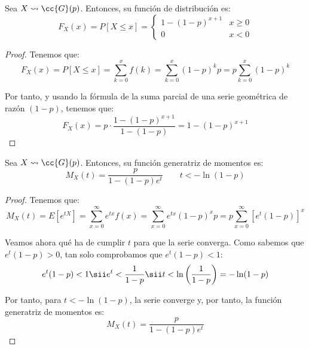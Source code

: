 \begin{prop}
    Sea $X\leadsto \cc{G}(p)$. Entonces, su función de distribución es:
    \begin{equation*}
        F_X(x) = P[X\leq x] = \begin{cases}
            1-(1-p)^{x+1} & x\geq 0 \\
            0 & x<0
        \end{cases}
    \end{equation*}
\end{prop}
\begin{proof}
    Tenemos que:
    \begin{equation*}
        F_X(x) = P[X\leq x] = \sum_{k=0}^x f(k) = \sum_{k=0}^x (1-p)^{k}p = p\sum_{k=0}^x (1-p)^{k}
    \end{equation*}

    Por tanto, y usando la fórmula de la suma parcial de una serie geométrica de razón $(1-p)$, tenemos que:
    \begin{equation*}
        F_X(x) = p\cdot \frac{1-(1-p)^{x+1}}{1-(1-p)} = 1-(1-p)^{x+1}
    \end{equation*}
\end{proof}

\begin{prop}
    Sea $X\leadsto \cc{G}(p)$. Entonces, su función generatriz de momentos es:
    \begin{equation*}
        M_X(t) = \frac{p}{1-(1-p)e^t} \qquad t<-\ln(1-p)
    \end{equation*}
\end{prop}
\begin{proof}
    Tenemos que:
    \begin{equation*}
        M_X(t) = E[e^{tX}] = \sum_{x=0}^\infty e^{tx}f(x) = \sum_{x=0}^\infty e^{tx}(1-p)^{x}p = p\sum_{x=0}^\infty [e^t(1-p)]^x
    \end{equation*}

    Veamos ahora qué ha de cumplir $t$ para que la serie converga. Como
    sabemos que $e^t(1-p)>0$, tan solo comprobamos que $e^t(1-p)<1$:
    \begin{equation*}
        e^t(1-p)<1 \sii e^t<\frac{1}{1-p} \sii t<\ln\left(\frac{1}{1-p}\right) = -\ln(1-p)
    \end{equation*}

    Por tanto, para $t<-\ln(1-p)$, la serie converge y, por tanto, la función generatriz de momentos es:
    \begin{equation*}
        M_X(t) = \frac{p}{1-(1-p)e^t}
    \end{equation*}
\end{proof}


